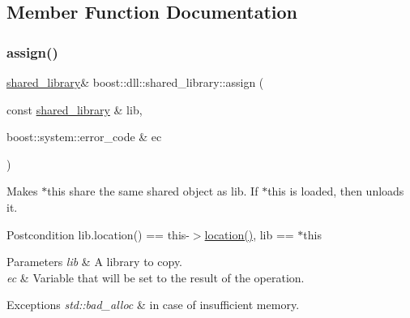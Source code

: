 \subsection{Member Function Documentation}
\mbox{\label{a01708_a2a721aaeab6fcb572362d002b3aceb7c}} 
\subsubsection{\texorpdfstring{assign()}{assign()}\hspace{0.1cm}{\footnotesize\ttfamily [1/2]}}
{\footnotesize\ttfamily \hyperlink{a01708}{shared\+\_\+library}\& boost\+::dll\+::shared\+\_\+library\+::assign (\begin{DoxyParamCaption}\item[{const \hyperlink{a01708}{shared\+\_\+library} \&}]{lib,  }\item[{boost\+::system\+::error\+\_\+code \&}]{ec }\end{DoxyParamCaption})\hspace{0.3cm}{\ttfamily [inline]}}

Makes $\ast$this share the same shared object as lib. If $\ast$this is loaded, then unloads it.

\begin{DoxyPostcond}{Postcondition}
lib.\+location() == this-\/$>$\hyperlink{a01708_a6de31089479b7e508d7fb67e752a635e}{location()}, lib == $\ast$this 
\end{DoxyPostcond}

\begin{DoxyParams}{Parameters}
{\em lib} & A library to copy. \\
\hline
{\em ec} & Variable that will be set to the result of the operation. \\
\hline
\end{DoxyParams}

\begin{DoxyExceptions}{Exceptions}
{\em std\+::bad\+\_\+alloc} & in case of insufficient memory. \\
\hline
\end{DoxyExceptions}
\mbox{\label{a01708_abd3dd2379776454171c9846217abdec9}} 
